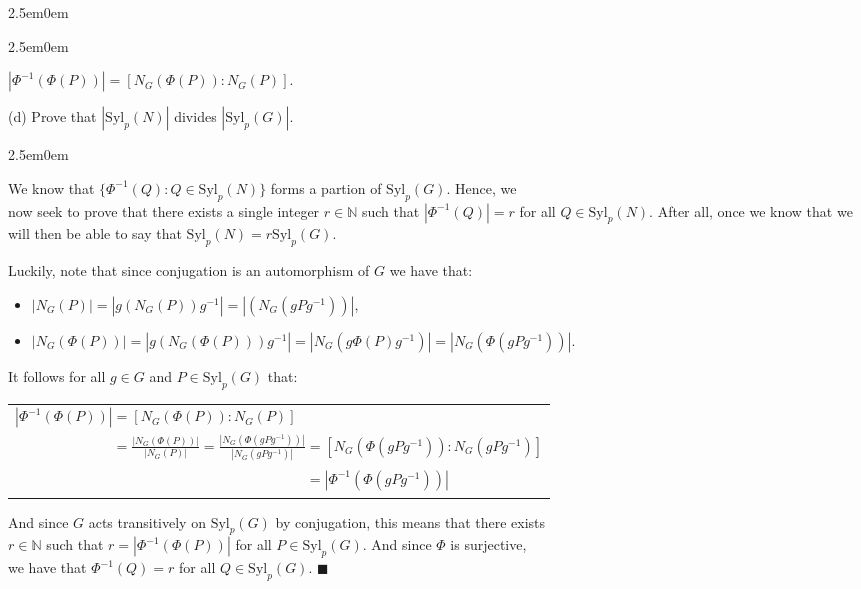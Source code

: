 \documentclass{book}
\newcommand{\HexOne}{%
   \color{Purple}%
   \fontsize{12}{13}\selectfont%
}
\newenvironment{myIndent}{%
   \begin{adjustwidth}{2.5em}{0em}%
}{%
   \end{adjustwidth}%
}
\newcommand{\Syl}{\mathrm{Syl}}
\newcommand{\retTwo}{\hfill\bigbreak}
\begin{document}
\begin{myIndent}
\begin{myIndent}
		{\centering$|\Phi^{-1}(\Phi(P))| = [N_G(\Phi(P)) : N_G(P)]$.\retTwo\par}
	\end{myIndent}

	\item[(d)] Prove that $|\Syl_p(N)|$ divides $|\Syl_p(G)|$.
	
	\begin{myIndent}\HexOne
		We know that $\{\Phi^{-1}(Q) : Q \in \Syl_p(N)\}$ forms a partion of $\Syl_p(G)$. Hence, we\\ [-2pt] now seek to prove that there exists a single integer $r \in \mathbb{N}$ such that $|\Phi^{-1}(Q)| = r$ for all $Q \in \Syl_p(N)$. After all, once we know that we will then be able to say that $\Syl_p(N) = r \Syl_p(G)$.\retTwo

		Luckily, note that since conjugation is an automorphism of $G$ we have that:
		\begin{itemize}
			\item $|N_G(P)| = |g(N_G(P))g^{-1}| = |(N_G(gPg^{-1}))|$,
			\item $|N_G(\Phi(P))| = |g(N_G(\Phi(P)))g^{-1}| = |N_G(g\Phi(P)g^{-1})| = |N_G(\Phi(gPg^{-1}))|$.\retTwo
		\end{itemize}

		It follows for all $g \in G$ and $P \in \Syl_p(G)$ that:

		{\centering\begin{tabular}{l}
			$|\Phi^{-1}(\Phi(P))| = [N_G(\Phi(P)) : N_G(P)]$ \\ [4pt]
			$\phantom{|\Phi^{-1}(\Phi(P))|} = \frac{|N_G(\Phi(P))|}{|N_G(P)|} = \frac{|N_G(\Phi(gPg^{-1}))|}{|N_G(gPg^{-1})|} = [N_G(\Phi(gPg^{-1})) : N_G(gPg^{-1})]$\\
			$\phantom{|\Phi^{-1}(\Phi(P))| = \frac{|N_G(\Phi(P))|}{|N_G(P)|} = \frac{|N_G(\Phi(gPg^{-1}))|}{|N_G(gPg^{-1})|}} = |\Phi^{-1}(\Phi(gPg^{-1}))|$
		\end{tabular}\retTwo\par}

		And since $G$ acts transitively on $\Syl_p(G)$ by conjugation, this means that there exists\\ $r \in \mathbb{N}$ such that $r = |\Phi^{-1}(\Phi(P))|$ for all $P \in \Syl_p(G)$. And since $\Phi$ is surjective,\\ we have that $\Phi^{-1}(Q) = r$ for all $Q \in \Syl_p(G)$. $\blacksquare$\retTwo
	\end{myIndent}
\end{myIndent}
\end{document}
